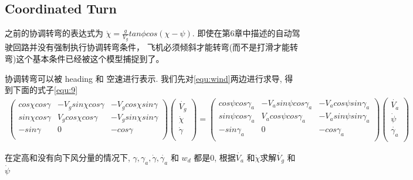 \documentclass[UTF8,a4paper,10pt,nocolorlinks]{ctexart}
\begin{document}
      \subsection{Coordinated Turn}
      之前的协调转弯的表达式为 $\dot{\chi} = \frac{g}{V_{g}} tan \phi cos(\chi - \psi)$. 
      即使在第6章中描述的自动驾驶回路并没有强制执行协调转弯条件，
      飞机必须倾斜才能转弯(而不是打滑才能转弯)这个基本条件已经被这个模型捕捉到了。\par
      协调转弯可以被 heading 和 空速进行表示. 我们先对\ref{equ:wind}两边进行求导, 得到下面的式子\ref{equ:9}
      \begin{gather} %
        \begin{pmatrix}
            cos \chi cos \gamma & - V_{g} sin \chi cos \gamma & - V_{g} cos \chi sin \gamma \\
            sin \chi cos \gamma & V_{g} cos \chi cos \gamma & - V_{g} sin \chi sin \gamma \\
            -sin \gamma & 0 & -cos \gamma \\
          \end{pmatrix} \begin{pmatrix}
            \dot{V_{g}} \\
            \dot{\chi} \\
            \dot{\gamma} \\
        \end{pmatrix}
          = \begin{pmatrix}
            cos \psi cos \gamma_{a} & - V_{a} sin \psi cos \gamma_{a} & - V_{a} cos \psi sin \gamma_{a} \\
            sin \psi cos \gamma_{a} & V_{a} cos \psi cos \gamma_{a} & - V_{a} sin \psi sin \gamma_{a} \\
            -sin \gamma_{a} & 0 & -cos \gamma_{a} \\
          \end{pmatrix} \begin{pmatrix}
            \dot{V_{a}} \\
            \dot{\psi} \\
            \dot{\gamma_{a}} \\
        \end{pmatrix}
          \label{equ:9}
      \end{gather}
      \par 在定高和没有向下风分量的情况下, $\gamma, \gamma_{a}, \dot{\gamma}, \dot{\gamma_a}$ 和 $w_{d}$ 都是0, 根据$\dot{V_{a}}$ 和$\dot{\chi}$求解$\dot{V_{g}}$ 和$\dot{\psi}$
\end{document}
